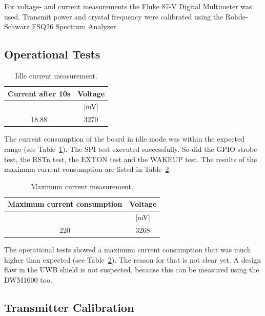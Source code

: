 \documentclass[journal,comsoc]{IEEEtran}
\begin{document}
For voltage- and current measurements the Fluke 87-V Digital Multimeter was used.
Transmit power and crystal frequency were calibrated using the Rohde-Schwarz FSQ26 Spectrum Analyzer.

\subsection{Operational Tests}
\label{subsec:optests}
\begin{table}[h!]
	\centering
	\begin{tabular}{|c|c|}
		\hline
		\textbf{Current after 10s} & \textbf{Voltage} \\ \hline
		[mA] & [mV] \\ \hline\hline
		18.88 & 3270 \\
		\hline		
	\end{tabular}
	\vspace{1.5mm}
	\caption{Idle current measurement.}
	\label{tab:resultsidlecurrent}
\end{table}
The current consumption of the board in idle mode was within the expected range (see Table~\ref{tab:resultsidlecurrent}).
The SPI test executed successfully.
So did the GPIO strobe test, the RSTn test, the EXTON test and the WAKEUP test.
The results of the maximum current consumption are listed in Table~\ref{tab:resultmaxcurrent}.
\begin{table}[h!]
	\centering
	\begin{tabular}{|c|c|}
		\hline
		\textbf{Maximum current consumption} & \textbf{Voltage} \\ \hline
		[mA] & [mV] \\ \hline\hline
		220 & 3268 \\
		\hline
	\end{tabular}
	\vspace{1.5mm}
	\caption{Maximum current measurement.}
	\label{tab:resultmaxcurrent}
\end{table}
The operational tests showed a maximum current consumption that was much higher than expected (see Table~\ref{tab:resultmaxcurrent}).
The reason for that is not clear yet.
A design flaw in the UWB shield is not suspected, because this can be measured using the DWM1000 too.


\subsection{Transmitter Calibration}
\label{subsec:txcalibration}
\end{document}
